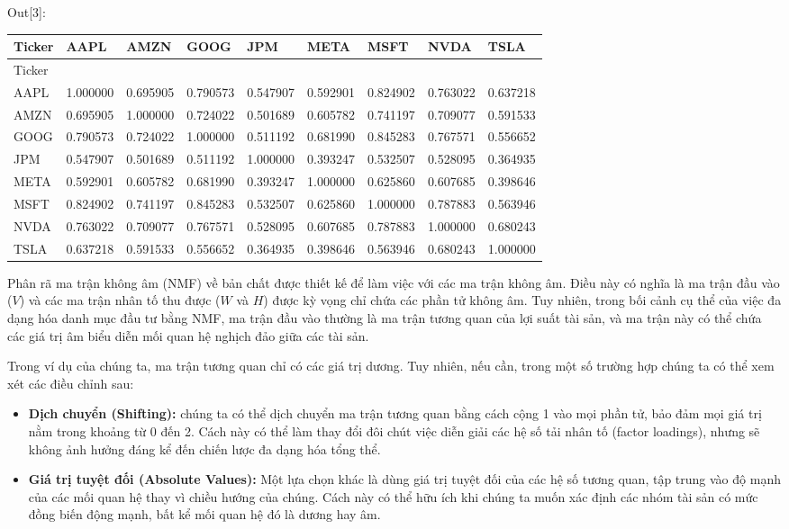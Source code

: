 Out{[}3{]}:

{\small
\begin{longtable}[]{@{}lllllllll@{}}
\toprule\noalign{}
Ticker & AAPL & AMZN & GOOG & JPM & META & MSFT & NVDA & TSLA \\
\midrule\noalign{}
\endhead
\bottomrule\noalign{}
\endlastfoot
Ticker & & & & & & & & \\
AAPL & 1.000000 & 0.695905 & 0.790573 & 0.547907 & 0.592901 & 0.824902 & 0.763022 & 0.637218 \\
AMZN & 0.695905 & 1.000000 & 0.724022 & 0.501689 & 0.605782 & 0.741197 & 0.709077 & 0.591533 \\
GOOG & 0.790573 & 0.724022 & 1.000000 & 0.511192 & 0.681990 & 0.845283 & 0.767571 & 0.556652 \\
JPM & 0.547907 & 0.501689 & 0.511192 & 1.000000 & 0.393247 & 0.532507 & 0.528095 & 0.364935 \\
META & 0.592901 & 0.605782 & 0.681990 & 0.393247 & 1.000000 & 0.625860 & 0.607685 & 0.398646 \\
MSFT & 0.824902 & 0.741197 & 0.845283 & 0.532507 & 0.625860 & 1.000000 & 0.787883 & 0.563946 \\
NVDA & 0.763022 & 0.709077 & 0.767571 & 0.528095 & 0.607685 & 0.787883 & 1.000000 & 0.680243 \\
TSLA & 0.637218 & 0.591533 & 0.556652 & 0.364935 & 0.398646 & 0.563946 & 0.680243 & 1.000000 \\
\end{longtable}
}

Phân rã ma trận không âm (NMF) về bản chất được thiết kế để làm việc với các ma trận không âm. Điều này có nghĩa là ma trận đầu vào (\(V\)) và các ma trận nhân tố thu được (\(W\) và \(H\)) được kỳ vọng chỉ chứa các phần tử không âm. Tuy nhiên, trong bối cảnh cụ thể của việc đa dạng hóa danh mục đầu tư bằng NMF, ma trận đầu vào thường là ma trận tương quan của lợi suất tài sản, và ma trận này có thể chứa các giá trị âm biểu diễn mối quan hệ nghịch đảo giữa các tài sản.

Trong ví dụ của chúng ta, ma trận tương quan chỉ có các giá trị dương. Tuy nhiên, nếu cần, trong một số trường hợp chúng ta có thể xem xét các điều chỉnh sau:

\begin{itemize}
\item
  \textbf{Dịch chuyển (Shifting):} chúng ta có thể dịch chuyển ma trận tương quan bằng cách cộng 1 vào mọi phần tử, bảo đảm mọi giá trị nằm trong khoảng từ 0 đến 2. Cách này có thể làm thay đổi đôi chút việc diễn giải các hệ số tải nhân tố (factor loadings), nhưng sẽ không ảnh hưởng đáng kể đến chiến lược đa dạng hóa tổng thể.
\item
  \textbf{Giá trị tuyệt đối (Absolute Values):} Một lựa chọn khác là dùng giá trị tuyệt đối của các hệ số tương quan, tập trung vào độ mạnh của các mối quan hệ thay vì chiều hướng của chúng. Cách này có thể hữu ích khi chúng ta muốn xác định các nhóm tài sản có mức đồng biến động mạnh, bất kể mối quan hệ đó là dương hay âm.
\end{itemize}


